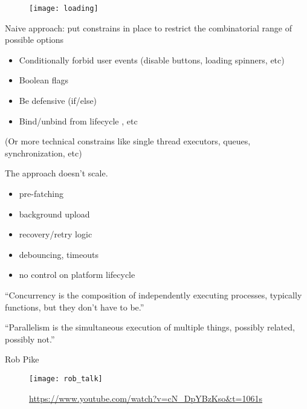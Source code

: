 \documentclass[10pt]{beamer}
\begin{document}
\begin{frame}[fragile]
	\begin{figure}
		\texttt{[image: loading]}
	\end{figure}
\end{frame}
\begin{frame}[fragile]
	Naive approach: put constrains in place to restrict the combinatorial range of possible options  
	\begin{itemize}
		\item Conditionally forbid user events (disable buttons, loading spinners, etc) 
		\item Boolean flags 
		\item Be defensive (if/else) 
		\item Bind/unbind from lifecycle , etc
	\end{itemize}
	(Or more technical constrains like single thread executors, queues, synchronization, etc)
\end{frame}

\begin{frame}
	The approach doesn't scale. 

	\begin{itemize}
		\item pre-fatching
		\item background upload
		\item recovery/retry logic 
		\item debouncing, timeouts 
		\item no control on platform lifecycle
	\end{itemize}

\end{frame}

\begin{frame}[fragile]
	``Concurrency is the composition of independently executing processes, typically functions, but they don't have to be.''

	``Parallelism is the simultaneous execution of multiple things, possibly related, possibly not.''

Rob Pike

\end{frame}
\begin{frame}[fragile]
	\begin{figure}
		\texttt{[image: rob\_talk]}
		\caption{\url{https://www.youtube.com/watch?v=cN_DpYBzKso&t=1061s}}
	\end{figure}
\end{frame}
\end{document}
